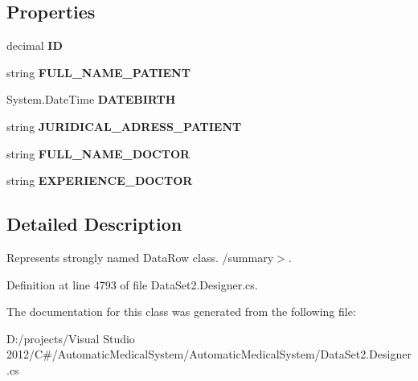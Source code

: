 \subsection*{Properties}
\begin{CompactItemize}
\item 
decimal \textbf{ID}\hspace{0.3cm}{\tt  [get, set]}\label{class_automatic_medical_system_1_1_data_set2_1_1_v_f_a_m_i_l_y_d_o_c_t_o_r_row_84eca84166869181c7200ae4c27deab6}

\item 
string \textbf{FULL\_\-NAME\_\-PATIENT}\hspace{0.3cm}{\tt  [get, set]}\label{class_automatic_medical_system_1_1_data_set2_1_1_v_f_a_m_i_l_y_d_o_c_t_o_r_row_4bf9a78e941715021e4462f8f8fc417e}

\item 
System.DateTime \textbf{DATEBIRTH}\hspace{0.3cm}{\tt  [get, set]}\label{class_automatic_medical_system_1_1_data_set2_1_1_v_f_a_m_i_l_y_d_o_c_t_o_r_row_c8637dd492768af8d367af1faa280d5b}

\item 
string \textbf{JURIDICAL\_\-ADRESS\_\-PATIENT}\hspace{0.3cm}{\tt  [get, set]}\label{class_automatic_medical_system_1_1_data_set2_1_1_v_f_a_m_i_l_y_d_o_c_t_o_r_row_57db176b738810dde01c5edb83d9390b}

\item 
string \textbf{FULL\_\-NAME\_\-DOCTOR}\hspace{0.3cm}{\tt  [get, set]}\label{class_automatic_medical_system_1_1_data_set2_1_1_v_f_a_m_i_l_y_d_o_c_t_o_r_row_af24f68e957483e861a0a8d9823db69b}

\item 
string \textbf{EXPERIENCE\_\-DOCTOR}\hspace{0.3cm}{\tt  [get, set]}\label{class_automatic_medical_system_1_1_data_set2_1_1_v_f_a_m_i_l_y_d_o_c_t_o_r_row_0167cf5a7d1459d4ee7edcf595c84770}

\end{CompactItemize}


\subsection{Detailed Description}
Represents strongly named DataRow class. /summary$>$. 

Definition at line 4793 of file DataSet2.Designer.cs.

The documentation for this class was generated from the following file:\begin{CompactItemize}
\item 
D:/projects/Visual Studio 2012/C\#/AutomaticMedicalSystem/AutomaticMedicalSystem/DataSet2.Designer.cs\end{CompactItemize}
